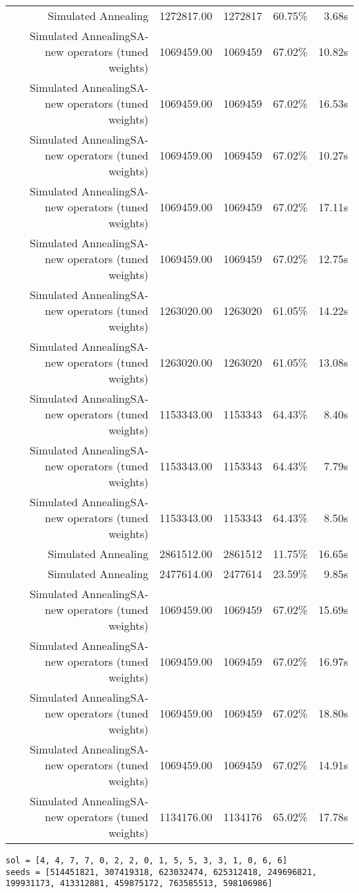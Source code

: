 \begin{table}[ht]
\begin{tabular}{|r|r|r|r|r|}
Simulated Annealing & 1272817.00 & 1272817 & 60.75\% & 3.68s\\
Simulated AnnealingSA-new operators (tuned weights) & 1069459.00 & 1069459 & 67.02\% & 10.82s\\
Simulated AnnealingSA-new operators (tuned weights) & 1069459.00 & 1069459 & 67.02\% & 16.53s\\
Simulated AnnealingSA-new operators (tuned weights) & 1069459.00 & 1069459 & 67.02\% & 10.27s\\
Simulated AnnealingSA-new operators (tuned weights) & 1069459.00 & 1069459 & 67.02\% & 17.11s\\
Simulated AnnealingSA-new operators (tuned weights) & 1069459.00 & 1069459 & 67.02\% & 12.75s\\
Simulated AnnealingSA-new operators (tuned weights) & 1263020.00 & 1263020 & 61.05\% & 14.22s\\
Simulated AnnealingSA-new operators (tuned weights) & 1263020.00 & 1263020 & 61.05\% & 13.08s\\
Simulated AnnealingSA-new operators (tuned weights) & 1153343.00 & 1153343 & 64.43\% & 8.40s\\
Simulated AnnealingSA-new operators (tuned weights) & 1153343.00 & 1153343 & 64.43\% & 7.79s\\
Simulated AnnealingSA-new operators (tuned weights) & 1153343.00 & 1153343 & 64.43\% & 8.50s\\
Simulated Annealing & 2861512.00 & 2861512 & 11.75\% & 16.65s\\
Simulated Annealing & 2477614.00 & 2477614 & 23.59\% & 9.85s\\
Simulated AnnealingSA-new operators (tuned weights) & 1069459.00 & 1069459 & 67.02\% & 15.69s\\
Simulated AnnealingSA-new operators (tuned weights) & 1069459.00 & 1069459 & 67.02\% & 16.97s\\
Simulated AnnealingSA-new operators (tuned weights) & 1069459.00 & 1069459 & 67.02\% & 18.80s\\
Simulated AnnealingSA-new operators (tuned weights) & 1069459.00 & 1069459 & 67.02\% & 14.91s\\
Simulated AnnealingSA-new operators (tuned weights) & 1134176.00 & 1134176 & 65.02\% & 17.78s\\
\end{tabular}%
\end{table}
\begin{lstlisting}[label={lst:call7vehicle3},caption=Optimal solution call\_7\_vehicle\_3]
sol = [4, 4, 7, 7, 0, 2, 2, 0, 1, 5, 5, 3, 3, 1, 0, 6, 6]
seeds = [514451821, 307419318, 623032474, 625312418, 249696821, 199931173, 413312881, 459875172, 763585513, 598106986]
\end{lstlisting}%
\clearpage


